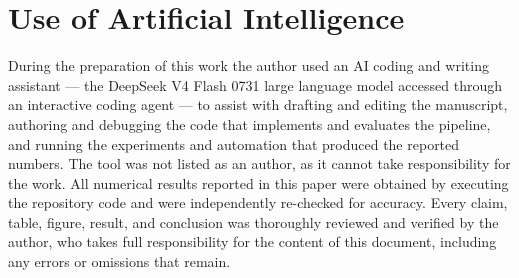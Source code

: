 \documentclass[conference]{IEEEtran}
\begin{document}
\section*{Use of Artificial Intelligence}
During the preparation of this work the author used an AI coding and writing assistant --- the DeepSeek V4 Flash 0731 large language model accessed through an interactive coding agent --- to assist with drafting and editing the manuscript, authoring and debugging the code that implements and evaluates the pipeline, and running the experiments and automation that produced the reported numbers. The tool was not listed as an author, as it cannot take responsibility for the work. All numerical results reported in this paper were obtained by executing the repository code and were independently re-checked for accuracy. Every claim, table, figure, result, and conclusion was thoroughly reviewed and verified by the author, who takes full responsibility for the content of this document, including any errors or omissions that remain.
\end{document}
